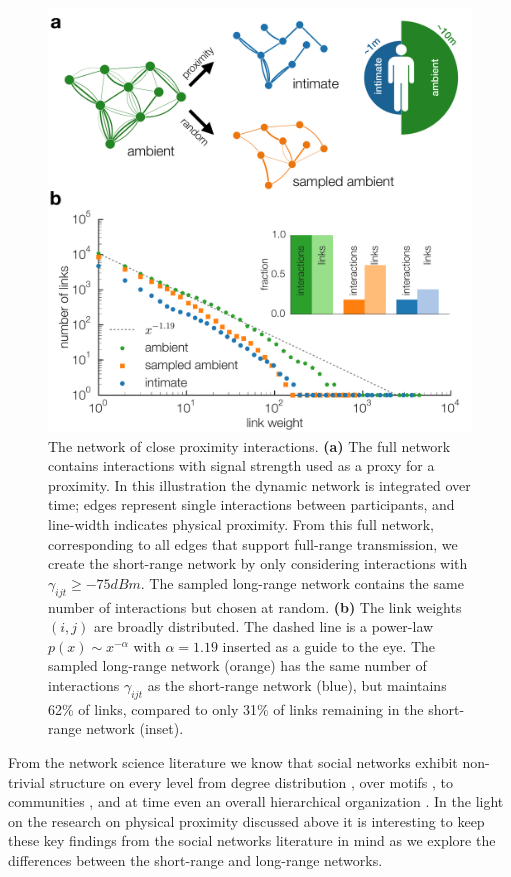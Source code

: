 \documentclass[fleqn,10pt]{wlscirep}
\begin{document}
\begin{figure}[h!]
\begin{center}
\includegraphics[width=.6\hsize]{panel_1.pdf}
\end{center}
\caption{The network of close proximity interactions.
\textbf{(a)} The full network contains interactions with signal strength used as a proxy for a proximity. In this illustration the dynamic network is integrated over time; edges represent single interactions between participants, and line-width indicates physical proximity. From this full network, corresponding to all edges that support full-range transmission, we create the short-range network by only considering interactions with $\gamma_{ijt} \geq -75 dBm$. The sampled long-range network contains the same number of interactions but chosen at random.
\textbf{(b)} The link weights $(i,j)$ are broadly distributed. The dashed line is a power-law $p(x) \sim x^{-\alpha}$ with $\alpha = 1.19$ inserted as a guide to the eye. The sampled long-range network (orange) has the same number of interactions $\gamma_{ijt}$ as the short-range network (blue), but maintains 62\% of links, compared to only 31\% of links remaining in the short-range network (inset).
\label{fig:panel_1}}
\end{figure}

From the network science literature we know that social networks exhibit non-trivial structure on every level from degree distribution \cite{barabasi1999emergence, eubank2004modelling}, over motifs \cite{milo2002network, szell2010multirelational}, to communities \cite{girvan2002community, onnela2007structure, fortunato2010community}, and at time even an overall hierarchical organization \cite{ahn2010link}.
In the light on the research on physical proximity discussed above it is interesting to keep these key findings from the social networks literature in mind as we explore the differences between the short-range and long-range networks.
\end{document}
